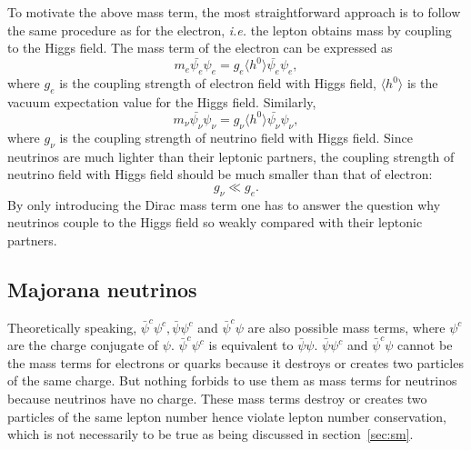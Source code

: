To motivate the above mass term, the most straightforward approach is
to follow the same procedure as for the electron, \textit{i.e.} the
lepton obtains mass by coupling to the Higgs field. The mass term of
the electron can be expressed as
\begin{equation}
  \label{eq:dme}
  m_{e}\bar{\psi_e}\psi_{e} = g_{e}\langle      
h^{0}\rangle\bar{\psi_e}\psi_{e},
\end{equation}
where $g_e$ is the coupling strength of electron field with Higgs
field, $\langle h^{0}\rangle$ is the vacuum expectation value for the
Higgs field. Similarly,
\begin{equation}
  \label{eq:dmnu}
  m_{\nu}\bar{\psi_\nu}\psi_{\nu} = g_{\nu}\langle  
h^{0}\rangle\bar{\psi_\nu}\psi_{\nu},
\end{equation}
where $g_\nu$ is the coupling strength of neutrino field with Higgs
field. Since neutrinos are much lighter than their leptonic partners,
the coupling strength of neutrino field with Higgs field should be
much smaller than that of electron:
\begin{equation}
  \label{eq:gg}
  g_{\nu} \ll g_{e}.
\end{equation}
By only introducing the Dirac mass term one has to answer the question
why neutrinos couple to the Higgs field so weakly compared with their
leptonic partners.

\subsection{Majorana neutrinos}
\label{sec:major}
Theoretically speaking, $\bar{\psi}^{c}\psi^{c}, \bar{\psi}\psi^{c}$
and $\bar{\psi}^{c}\psi$ are also possible mass terms, where
$\psi^{c}$ are the charge conjugate of $\psi$.
$\bar{\psi}^{c}\psi^{c}$ is equivalent to $\bar{\psi}\psi$.
$\bar{\psi}\psi^{c}$ and $\bar{\psi}^{c}\psi$ cannot be the mass terms
for electrons or quarks because it destroys or creates two particles
of the same charge. But nothing forbids to use them as mass terms for
neutrinos because neutrinos have no charge. These mass terms destroy
or creates two particles of the same lepton number hence violate
lepton number conservation, which is not necessarily to be true as
being discussed in section~\ref{sec:sm}.

